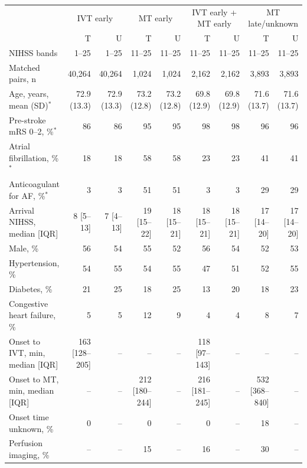 \begin{tabular}{lrrrrrrrr}
\toprule
 & \multicolumn{2}{c}{IVT early} & \multicolumn{2}{c}{MT early} & \multicolumn{2}{c}{IVT early + MT early} & \multicolumn{2}{c}{MT late/unknown} \\
\cmidrule(lr){2-3}\cmidrule(lr){4-5}\cmidrule(lr){6-7}\cmidrule(lr){8-9}
 & T & U & T & U & T & U & T & U \\
\midrule
NIHSS bands & 1--25 & 1--25 & 11--25 & 11--25 & 11--25 & 11--25 & 11--25 & 11--25 \\
Matched pairs, n & 40,264 & 40,264 & 1,024 & 1,024 & 2,162 & 2,162 & 3,893 & 3,893 \\
Age, years, mean (SD)$^{*}$ & 72.9 (13.3) & 72.9 (13.3) & 73.2 (12.8) & 73.2 (12.8) & 69.8 (12.9) & 69.8 (12.9) & 71.6 (13.7) & 71.6 (13.7) \\
Pre-stroke mRS 0--2, \%$^{*}$ & 86 & 86 & 95 & 95 & 98 & 98 & 96 & 96 \\
Atrial fibrillation, \%$^{*}$ & 18 & 18 & 58 & 58 & 23 & 23 & 41 & 41 \\
Anticoagulant for AF, \%$^{*}$ & 3 & 3 & 51 & 51 & 3 & 3 & 29 & 29 \\
Arrival NIHSS, median [IQR] & 8 [5--13] & 7 [4--13] & 19 [15--22] & 18 [15--21] & 18 [15--21] & 18 [15--21] & 17 [14--20] & 17 [14--20] \\
Male, \% & 56 & 54 & 55 & 52 & 56 & 54 & 52 & 53 \\
Hypertension, \% & 54 & 55 & 54 & 55 & 47 & 51 & 52 & 55 \\
Diabetes, \% & 21 & 25 & 18 & 25 & 13 & 20 & 18 & 23 \\
Congestive heart failure, \% & 5 & 5 & 12 & 9 & 4 & 4 & 8 & 7 \\
Onset to IVT, min, median [IQR] & 163 [128--205] & -- & -- & -- & 118 [97--143] & -- & -- & -- \\
Onset to MT, min, median [IQR] & -- & -- & 212 [180--244] & -- & 216 [181--245] & -- & 532 [368--840] & -- \\
Onset time unknown, \% & 0 & -- & 0 & -- & 0 & -- & 18 & -- \\
Perfusion imaging, \% & -- & -- & 15 & -- & 16 & -- & 30 & -- \\
\bottomrule
\end{tabular}
